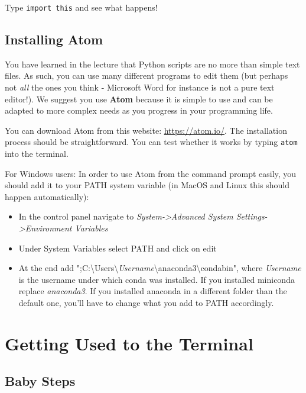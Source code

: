 \vspace{1em}

\noindent Type \texttt{import this} and see what happens!

\subsection{Installing Atom}

You have learned in the lecture that Python scripts are no more than simple text files. As such, you can use many different programs to edit them (but perhaps not \textit{all} the ones you think - Microsoft Word for instance is not a pure text editor!). We suggest you use \textbf{Atom} because it is simple to use and can be adapted to more complex needs as you progress in your programming life.

\vspace{1em}

\noindent You can download Atom from this website: \url{https://atom.io/}. The installation process should be straightforward. You can test whether it works by typing \texttt{atom} into the terminal.

\noindent For Windows users: In order to use Atom from the command prompt easily, you should add it to your PATH system variable (in MacOS and Linux this should happen automatically): 

\begin{itemize}
    \item In the control panel navigate to \textit{System->Advanced System Settings->Environment Variables}
    \item Under System Variables select PATH and click on edit
    \item At the end add ";C:\textbackslash Users\textbackslash \textit{Username}\textbackslash anaconda3\textbackslash condabin", where \textit{Username} is the username under which conda was installed. If you installed miniconda replace \textit{anaconda3}. If you installed anaconda in a different folder than the default one, you'll have to change what you add to PATH accordingly.

\end{itemize}

\section{Getting Used to the Terminal}

\subsection{Baby Steps}

